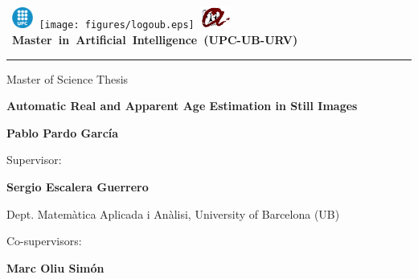 \thispagestyle{empty}
\vspace*{-2cm}

\hbox{
\includegraphics[width=0.7cm]{figures/logoupc.eps}
\texttt{[image: figures/logoub.eps]}
\includegraphics[width=1cm]{figures/logourv.eps}
\Large \bf Master in Artificial Intelligence (UPC-UB-URV)}
\hrule

\bigskip\bigskip\bigskip

\begin{center}

{\LARGE Master of Science Thesis}

\bigskip\bigskip\bigskip\bigskip\bigskip

\textbf{\huge \bf Automatic Real and Apparent Age Estimation in Still Images}

\bigskip\bigskip\bigskip\bigskip\bigskip

{\LARGE \bf Pablo Pardo García}

\end{center}
\vspace*{3cm}

\begin{center}
{\large Supervisor:}
\end{center}

\medskip %

{\Large\bf Sergio Escalera Guerrero}

\medskip %

{Dept. Matemàtica Aplicada i Anàlisi, University of Barcelona (UB)}

\medskip



\bigskip %

\begin{center}
{\large Co-supervisors:}
\end{center}
	
\medskip %

{\Large\bf Marc Oliu Simón}

\medskip %


